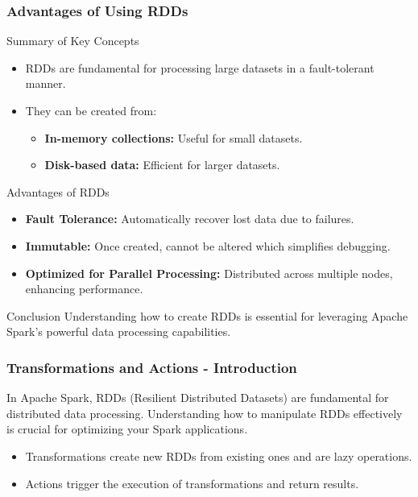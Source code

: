 \documentclass[aspectratio=169]{beamer}
\begin{document}
\begin{frame}[fragile]
    \frametitle{Advantages of Using RDDs}
    \begin{block}{Summary of Key Concepts}
        \begin{itemize}
            \item RDDs are fundamental for processing large datasets in a fault-tolerant manner.
            \item They can be created from:
            \begin{itemize}
                \item \textbf{In-memory collections:} Useful for small datasets.
                \item \textbf{Disk-based data:} Efficient for larger datasets.
            \end{itemize}
        \end{itemize}
    \end{block}
    
    \begin{block}{Advantages of RDDs}
        \begin{itemize}
            \item \textbf{Fault Tolerance:} Automatically recover lost data due to failures.
            \item \textbf{Immutable:} Once created, cannot be altered which simplifies debugging.
            \item \textbf{Optimized for Parallel Processing:} Distributed across multiple nodes, enhancing performance.
        \end{itemize}
    \end{block}

    \begin{block}{Conclusion}
        Understanding how to create RDDs is essential for leveraging Apache Spark's powerful data processing capabilities.
    \end{block}
\end{frame}

\begin{frame}[fragile]
    \frametitle{Transformations and Actions - Introduction}
    In Apache Spark, RDDs (Resilient Distributed Datasets) are fundamental for distributed data processing. 
    Understanding how to manipulate RDDs effectively is crucial for optimizing your Spark applications.
    
    \begin{itemize}
        \item Transformations create new RDDs from existing ones and are lazy operations.
        \item Actions trigger the execution of transformations and return results.
    \end{itemize}
\end{frame}
\end{document}

